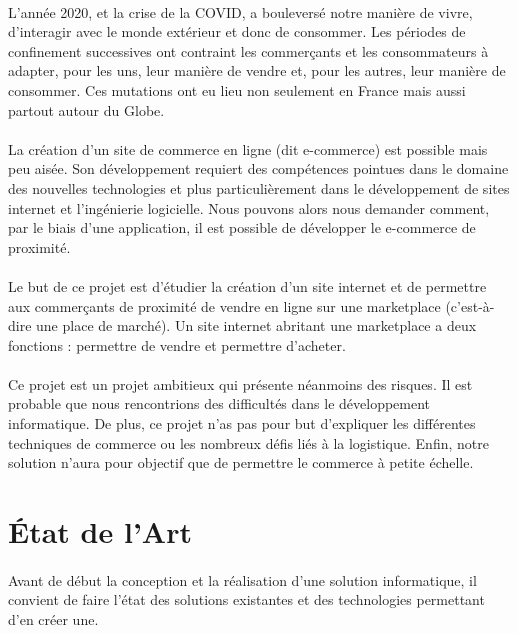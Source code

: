 \documentclass[a4paper, 12pt]{article}
\begin{document}
\paragraph{}L’année 2020, et la crise de la COVID, a bouleversé notre manière de vivre, d'interagir avec le monde extérieur et donc de consommer. Les périodes de confinement successives ont contraint les commerçants et les consommateurs à adapter, pour les uns, leur manière de vendre et, pour les autres, leur manière de consommer. Ces mutations ont eu lieu non seulement en France mais aussi partout autour du Globe.
\paragraph{}La création d’un site de commerce en ligne (dit e-commerce) est possible mais peu aisée. Son développement requiert des compétences pointues dans le domaine des nouvelles technologies et plus particulièrement dans le développement de sites internet et l'ingénierie logicielle. Nous pouvons alors nous demander comment, par le biais d’une application, il est possible de développer le e-commerce de proximité.
\paragraph{}Le but de ce projet est d’étudier la création d’un site internet et de permettre aux commerçants de proximité de vendre en ligne sur une marketplace (c’est-à-dire une place de marché). Un site internet abritant une marketplace a deux fonctions : permettre de vendre et permettre d’acheter.
\paragraph{}Ce projet est un projet ambitieux qui présente néanmoins des risques. Il est probable que nous rencontrions des difficultés dans le développement informatique. De plus, ce projet n’as pas pour but d’expliquer les différentes techniques de commerce ou les nombreux défis liés à la logistique. Enfin, notre solution n’aura pour objectif que de permettre le commerce à petite échelle.

\newpage
\section{État de l'Art}
\paragraph{}Avant de début la conception et la réalisation d'une solution informatique, il convient de faire l'état des solutions existantes et des technologies permettant d'en créer une.
\end{document}
